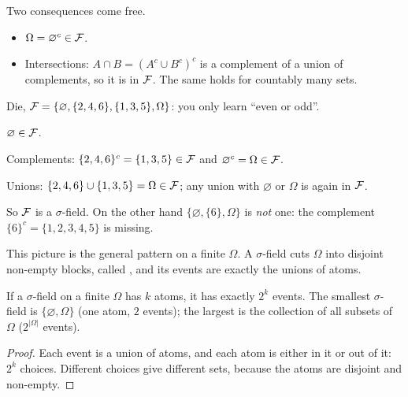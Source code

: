 Two consequences come free.
\begin{itemize}
  \item $\Omega=\varnothing^c\in\mathcal F$.
  \item Intersections: $A\cap B=(A^c\cup B^c)^c$ is a complement of a union of complements, so it is in $\mathcal F$. The same holds for countably many sets.
\end{itemize}

\begin{example}
\label{ex:die-even-odd}
Die, $\mathcal F=\{\varnothing,\{2,4,6\},\{1,3,5\},\Omega\}$: you only learn ``even or odd''.
\begin{steps}
  \item $\varnothing\in\mathcal F$.
  \item Complements: $\{2,4,6\}^c=\{1,3,5\}\in\mathcal F$ and $\varnothing^c=\Omega\in\mathcal F$.
  \item Unions: $\{2,4,6\}\cup\{1,3,5\}=\Omega\in\mathcal F$; any union with $\varnothing$ or $\Omega$ is again in $\mathcal F$.
\end{steps}
So $\mathcal F$ is a $\sigma$-field. On the other hand $\{\varnothing,\{6\},\Omega\}$ is \emph{not} one: the complement $\{6\}^c=\{1,2,3,4,5\}$ is missing.
\end{example}

\begin{pic}
\end{pic}

This picture is the general pattern on a finite $\Omega$. A $\sigma$-field cuts $\Omega$ into disjoint non-empty blocks, called , and its events are exactly the unions of atoms.

\begin{result}
\label{res:count}
If a $\sigma$-field on a finite $\Omega$ has $k$ atoms, it has exactly $2^k$ events. The smallest $\sigma$-field is $\{\varnothing,\Omega\}$ (one atom, $2$ events); the largest is the collection of all subsets of $\Omega$ ($2^{|\Omega|}$ events).
\end{result}
\begin{proof}
Each event is a union of atoms, and each atom is either in it or out of it: $2^k$ choices. Different choices give different sets, because the atoms are disjoint and non-empty.
\end{proof}

